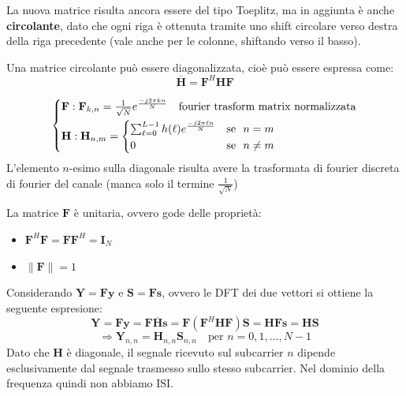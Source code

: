 La nuova matrice risulta ancora essere del tipo Toeplitz, ma in aggiunta è anche \textbf{circolante}, dato che ogni riga è ottenuta tramite uno shift circolare verso destra della riga precedente (vale anche per le colonne, shiftando verso il basso).

Una matrice circolante può essere diagonalizzata, cioè può essere espressa come:
\[
    \overline{\mathbf{H}} = \mathbf{F}^H \mathbf{H} \mathbf{F}
\]




\[
    \begin{cases*}
        \mathbf{F}: \mathbf{F}_{k, n} = \frac{1}{\sqrt{N}} e^{\frac{-j2\pi kn}{N}} \quad \text{fourier trasform matrix normalizzata} \\
        \mathbf{H}: \mathbf{H}_{n, m} = \begin{cases*}
                                                        \sum_{\ell=0}^{L-1} h(\ell) e^{\frac{-j2\pi \ell n}{N}} & \text{se } $n = m$ \\
                                                        0 & \text{se } $n \neq m$
                                                    \end{cases*}
    \end{cases*}
\]
L'elemento $n$-esimo sulla diagonale risulta avere la trasformata di fourier discreta di fourier del canale (manca solo il termine $\frac{1}{\sqrt{N}}$)


La matrice $\mathbf{F}$ è unitaria, ovvero gode delle proprietà:
\begin{itemize}
    \item $\mathbf{F}^H \mathbf{F} = \mathbf{F} \mathbf{F}^H = \mathbf{I}_N$
    \item $\| \mathbf{F} \| = 1$ 
\end{itemize}

Considerando $\mathbf{Y} = \mathbf{F} \mathbf{y}$ e $\mathbf{S} = \mathbf{F} \mathbf{s}$, ovvero le DFT dei due vettori si ottiene la seguente espresione:
\[
    \mathbf{Y} = \mathbf{F} \mathbf{y} = \mathbf{F} \mathbf{\overline{H}} \mathbf{s} = \mathbf{F} \left(\mathbf{F}^H \mathbf{H} \mathbf{F}\right)\mathbf{S} =  \mathbf{H} \mathbf{F} \mathbf{s} = \mathbf{H} \mathbf{S}
\]
\[
    \Rightarrow \mathbf{Y}_{n,n} = \mathbf{H}_{n,n} \mathbf{S}_{n,n} \quad \text{per } n = 0, 1, \ldots, N-1
\]
Dato che $\mathbf{H}$ è diagonale, il segnale ricevuto sul subcarrier $n$ dipende esclusivamente dal segnale trasmesso sullo stesso subcarrier. Nel dominio della frequenza quindi non abbiamo ISI.


